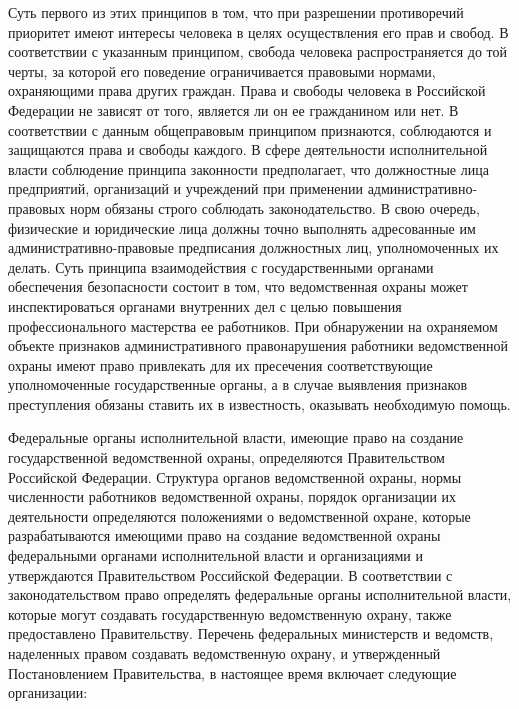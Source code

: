 \documentclass[a4paper,12pt,fleqn]{article} %
\begin{document}
Суть первого из этих принципов в том, что при разрешении противоречий приоритет имеют интересы человека в целях осуществления его прав и свобод. В соответствии с указанным принципом, свобода человека распространяется до той черты, за которой его поведение ограничивается правовыми нормами, охраняющими права других граждан. Права и свободы человека в Российской Федерации не зависят от того, является ли он ее гражданином или нет. В соответствии с данным общеправовым принципом признаются, соблюдаются и защищаются права и свободы каждого. В сфере деятельности исполнительной власти соблюдение принципа законности предполагает, что должностные лица предприятий, организаций и учреждений при применении административно-правовых норм обязаны строго соблюдать законодательство. В свою очередь, физические и юридические лица должны точно выполнять адресованные им административно-правовые предписания должностных лиц, уполномоченных их делать. Суть принципа взаимодействия с государственными органами обеспечения безопасности состоит в том, что ведомственная охраны может инспектироваться органами внутренних дел с целью повышения профессионального мастерства ее работников. При обнаружении на охраняемом объекте признаков административного правонарушения работники ведомственной охраны имеют право привлекать для их пресечения соответствующие уполномоченные государственные органы, а в случае выявления признаков преступления обязаны ставить их в известность, оказывать необходимую помощь.

Федеральные органы исполнительной власти,  имеющие право на создание государственной ведомственной охраны, определяются Правительством Российской Федерации. Структура органов ведомственной охраны, нормы численности работников ведомственной охраны, порядок организации их деятельности определяются положениями о ведомственной охране, которые разрабатываются имеющими право на создание ведомственной охраны федеральными органами исполнительной власти и организациями и утверждаются Правительством Российской Федерации. В соответствии с законодательством право определять федеральные органы исполнительной власти, которые могут создавать государственную ведомственную охрану, также предоставлено Правительству. Перечень федеральных министерств и ведомств, наделенных правом создавать ведомственную охрану, и утвержденный Постановлением Правительства,   в настоящее время включает следующие организации:
\end{document}
